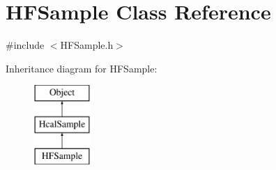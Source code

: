 \hypertarget{class_h_f_sample}{}\section{H\+F\+Sample Class Reference}
\label{class_h_f_sample}


{\ttfamily \#include $<$H\+F\+Sample.\+h$>$}

Inheritance diagram for H\+F\+Sample\+:\begin{figure}[H]
\begin{center}
\leavevmode
\includegraphics[height=3.000000cm]{class_h_f_sample}
\end{center}
\end{figure}
